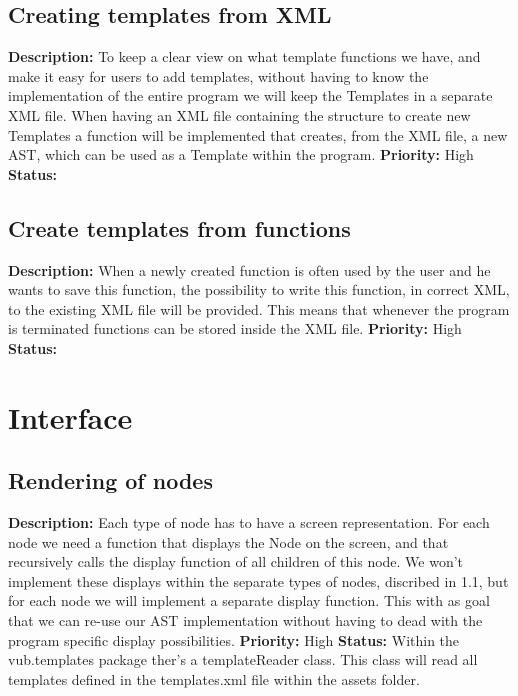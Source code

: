 \documentclass[a4paper,12pt]{report}
\begin{document}
\subsection{Creating templates from XML}
\textbf{Description: } To keep a clear view on what template functions we have, and make it easy for users to add templates, without having to know the implementation
of the entire program we will keep the Templates in a separate XML file. When having an XML file containing the structure to create new Templates a function will be implemented that creates, from the XML file, a new AST, which 
can be used as a Template within the program.\newline
\textbf{Priority:} High \newline
\textbf{Status: } \newline
\subsection{Create templates from functions}
\textbf{Description: } When a newly created function is often used by the user and he wants to save this function, the possibility to write this function, in correct XML, to
the existing XML file will be provided. This means that whenever the program is terminated functions can be stored inside the XML file.\newline
\textbf{Priority:} High \newline
\textbf{Status: } \newline
\section{Interface}
\subsection{Rendering of nodes}
\textbf{Description: }Each type of node has to have a screen representation. For each node we need a function that displays the Node on the screen, and 
that recursively calls the display function of all children of this node. We won't implement these displays within the separate types of nodes, discribed in 1.1, but 
for each node we will implement a separate display function. This with as goal that we can re-use our AST implementation without having to dead
with the program specific display possibilities.  \newline
\textbf{Priority:} High \newline
\textbf{Status: } Within the vub.templates package ther's a templateReader class. This class will read all templates defined in the 
templates.xml file within the assets folder. \newline
\end{document}
